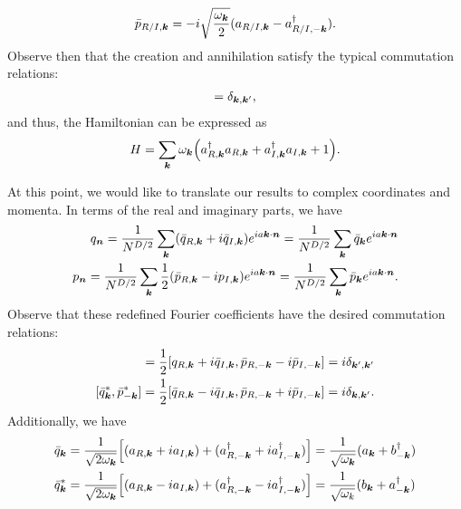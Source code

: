 {\begin{align}
    \bar{p}_{R/I,\vb*{k}} = -i \sqrt{\frac{\omega_{\vb*{k}}}{2}} ( a_{R/I,\vb*{k}} - a_{R/I,-\vb*{k}}^{\dagger} )
.\end{align}
Observe then that the creation and annihilation satisfy the typical commutation relations:
\begin{align}
    [a_{R/I,\vb*{k}},a_{R/I,\vb*{k}'}^{\dagger}] = \delta_{\vb*{k},\vb*{k}'}
,\end{align}
and thus, the Hamiltonian can be expressed as
\begin{align}
    H = \sum_{\vb*{k}} \omega_{\vb*{k}} \Big( a_{R,\vb*{k}}^{\dagger} a_{R,\vb*{k}} + a_{I,\vb*{k}}^{\dagger} a_{I,\vb*{k}} + 1 \Big)
.\end{align}

At this point, we would like to translate our results to complex coordinates and momenta.
In terms of the real and imaginary parts, we have
\begin{align}
    q_{\vb*{n}} = \frac{1}{N^{D/2}} \sum_{\vb*{k}} (\bar{q}_{R,\vb*{k}} + i \bar{q}_{I,\vb*{k}}) e^{i a \vb*{k} \cdot \vb*{n}} = \frac{1}{N^{D/2}} \sum_{\vb*{k}} \bar{q}_{\vb*{k}} e^{i a \vb*{k} \cdot \vb*{n}} \nonumber \\
    p_{\vb*{n}} = \frac{1}{N^{D/2}} \sum_{\vb*{k}} \frac{1}{2} ( \bar{p}_{R,\vb*{k}} - i p_{I,\vb*{k}} ) e^{i a \vb*{k} \cdot \vb*{n}} = \frac{1}{N^{D/2}} \sum_{\vb*{k}} \bar{p}_{\vb*{k}} e^{i a \vb*{k} \cdot \vb*{n}}
.\end{align}
Observe that these redefined Fourier coefficients have the desired commutation relations:
\begin{align}
    [\bar{q}_{\vb*{k}},\bar{p}_{-\vb*{k}}] = \frac{1}{2} [q_{R,\vb*{k}} + i \bar{q}_{I,\vb*{k}}, \bar{p}_{R,-\vb*{k}} - i \bar{p}_{I,-\vb*{k}}] = i \delta_{\vb*{k}',\vb*{k}'} \\
    [\bar{q}_{\vb*{k}}^{*},\bar{p}_{-\vb*{k}}^{*}] = \frac{1}{2} [ \bar{q}_{R,\vb*{k}} - i \bar{q}_{I,\vb*{k}}, \bar{p}_{R,-\vb*{k}} + i \bar{p}_{I,-\vb*{k}} ] = i \delta_{\vb*{k},\vb*{k}'}
.\end{align}
Additionally, we have 
\begin{align}
    \bar{q}_{\vb*{k}} &= \frac{1}{\sqrt{2 \omega_{\vb*{k}}}} \Big[ ( a_{R,\vb*{k}} + i a_{I,\vb*{k}} ) + ( a_{R,-\vb*{k}}^{\dagger} + i a_{I,-\vb*{k}}^{\dagger} ) \Big] = \frac{1}{\sqrt{\omega_{\vb*{k}}}} ( a_{\vb*{k}} + b_{-\vb*{k}}^{\dagger} ) \\
    \bar{q}_{\vb*{k}}^{*} &= \frac{1}{\sqrt{2 \omega_{\vb*{k}}}} \Big[ ( a_{R,\vb*{k}} - i a_{I,\vb*{k}} ) + ( a_{R,-\vb*{k}}^{\dagger} - i a_{I,-\vb*{k}}^{\dagger} ) \Big] = \frac{1}{\sqrt{\omega_{k}}} ( b_{\vb*{k}} + a_{-\vb*{k}}^{\dagger} )

\end{align}}
